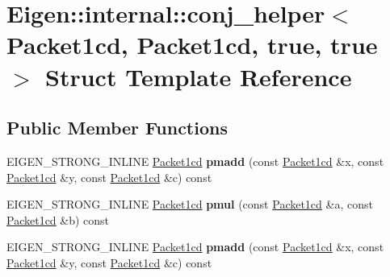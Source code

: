 \hypertarget{struct_eigen_1_1internal_1_1conj__helper_3_01_packet1cd_00_01_packet1cd_00_01true_00_01true_01_4}{}\section{Eigen\+:\+:internal\+:\+:conj\+\_\+helper$<$ Packet1cd, Packet1cd, true, true $>$ Struct Template Reference}
\label{struct_eigen_1_1internal_1_1conj__helper_3_01_packet1cd_00_01_packet1cd_00_01true_00_01true_01_4}
\subsection*{Public Member Functions}
\begin{DoxyCompactItemize}
\item 
\mbox{\label{struct_eigen_1_1internal_1_1conj__helper_3_01_packet1cd_00_01_packet1cd_00_01true_00_01true_01_4_ab0df31eba681670a0a08b1daf8bb9cef}} 
E\+I\+G\+E\+N\+\_\+\+S\+T\+R\+O\+N\+G\+\_\+\+I\+N\+L\+I\+NE \hyperlink{struct_eigen_1_1internal_1_1_packet1cd}{Packet1cd} {\bfseries pmadd} (const \hyperlink{struct_eigen_1_1internal_1_1_packet1cd}{Packet1cd} \&x, const \hyperlink{struct_eigen_1_1internal_1_1_packet1cd}{Packet1cd} \&y, const \hyperlink{struct_eigen_1_1internal_1_1_packet1cd}{Packet1cd} \&c) const
\item 
\mbox{\label{struct_eigen_1_1internal_1_1conj__helper_3_01_packet1cd_00_01_packet1cd_00_01true_00_01true_01_4_a4ef4207a9fe37dbfb82d1f059c27b1b3}} 
E\+I\+G\+E\+N\+\_\+\+S\+T\+R\+O\+N\+G\+\_\+\+I\+N\+L\+I\+NE \hyperlink{struct_eigen_1_1internal_1_1_packet1cd}{Packet1cd} {\bfseries pmul} (const \hyperlink{struct_eigen_1_1internal_1_1_packet1cd}{Packet1cd} \&a, const \hyperlink{struct_eigen_1_1internal_1_1_packet1cd}{Packet1cd} \&b) const
\item 
\mbox{\label{struct_eigen_1_1internal_1_1conj__helper_3_01_packet1cd_00_01_packet1cd_00_01true_00_01true_01_4_ab0df31eba681670a0a08b1daf8bb9cef}} 
E\+I\+G\+E\+N\+\_\+\+S\+T\+R\+O\+N\+G\+\_\+\+I\+N\+L\+I\+NE \hyperlink{struct_eigen_1_1internal_1_1_packet1cd}{Packet1cd} {\bfseries pmadd} (const \hyperlink{struct_eigen_1_1internal_1_1_packet1cd}{Packet1cd} \&x, const \hyperlink{struct_eigen_1_1internal_1_1_packet1cd}{Packet1cd} \&y, const \hyperlink{struct_eigen_1_1internal_1_1_packet1cd}{Packet1cd} \&c) const

\end{DoxyCompactItemize}
